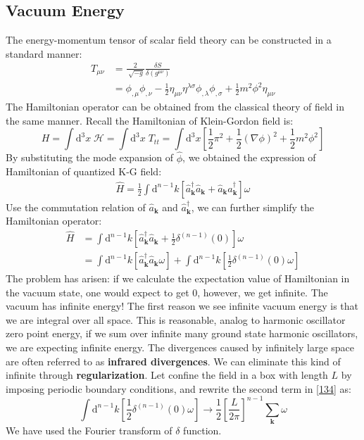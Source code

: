 \documentclass[12pt]{article}
\numberwithin{equation}{section}
\theoremstyle{1style}
\newcommand{\tbf}[1]{\textbf{#1}}
\newcommand{\id}{\mathrm{d}}
\begin{document}
\subsection{Vacuum Energy}
The energy-momentum tensor of scalar field theory can be constructed in a standard manner:
\begin{align}
  T_{\mu\nu} & =\frac{2}{\sqrt[]{-g}}\frac{\delta S}{\delta(g^{\mu\nu})}                                         \\
             & =\phi_{,\mu}\phi_{,\nu}-\frac{1}{2}\eta_{\mu\nu}\eta^{\lambda\sigma}\phi_{,\lambda}\phi_{,\sigma}
  +\frac{1}{2}m^2\phi^2\eta_{\mu\nu}
\end{align}
The Hamiltonian operator can be obtained from the classical theory of field in the same manner.
Recall the Hamiltonian of Klein-Gordon field is:
\begin{equation}
  H=\int\id^3x\;\mathcal{H}=\int\id^3x\;T_{tt}=\int\id^3x\left[\frac{1}{2}\pi^2+\frac{1}{2}(\nabla\phi)^2+\frac{1}{2}m^2\phi^2\right]
\end{equation}
By substituting the mode expansion of \(\hat{\phi}\), we obtained the expression of Hamiltonian of quantized K-G field:
\begin{align}
  \hat{H}=\frac{1}{2}\int \id^{n-1}k\left[\hat{a}^{\dagger}_{\mathbf{k}}\hat{a}_{\mathbf{k}}+\hat{a}_{\mathbf{k}}\hat{a}^{\dagger}_{\mathbf{k}}\right]\omega
\end{align}
Use the commutation relation of \(\hat{a}_{\mathbf{k}}\) and \(\hat{a}^{\dagger}_{\mathbf{k}}\), we can further simplify the Hamiltonian operator:
\begin{align}\label{134}
  \hat{H} & =\int \id^{n-1}k\left[\hat{a}^{\dagger}_{\mathbf{k}}\hat{a}_{\mathbf{k}}+\frac{1}{2}\delta^{(n-1)}(0)\right]\omega \\
          & =\int \id^{n-1}k\left[\hat{a}^{\dagger}_{\mathbf{k}}\hat{a}_{\mathbf{k}}\omega\right]+
  \int \id^{n-1}k\left[\frac{1}{2}\delta^{(n-1)}(0)\omega\right]
\end{align}
The problem has arisen: if we calculate the expectation value of Hamiltonian in the vacuum state, one would expect to get 0,
however, we get infinite.
The vacuum has infinite energy!
The first reason we see infinite vacuum energy is that we are integral over all space. This is reasonable, analog
to harmonic oscillator zero point energy,
if we sum over infinite many ground state harmonic oscillators, we are expecting infinite energy.
The divergences caused by infinitely large space are often referred to as \tbf{infrared divergences}.
We can eliminate this kind of infinite through \tbf{regularization}.
Let confine the field in a box with length \(L\) by imposing periodic boundary conditions, and rewrite the second term in \ref{134} as:
\begin{equation}\label{135}
  \int \id^{n-1}k\left[\frac{1}{2}\delta^{(n-1)}(0)\omega\right]\rightarrow\frac{1}{2}\left[\frac{L}{2\pi}\right]^{n-1}\sum_{\mathbf{k}}\omega
\end{equation}
We have used the Fourier transform of \(\delta\) function.
\end{document}

